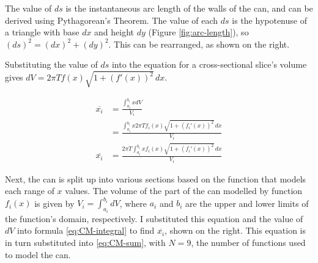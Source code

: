 \documentclass[11pt]{article}
\begin{document}
    The value of $ds$ is the instantaneous arc length of the walls of the can, and can be derived using Pythagorean's Theorem. The value of each $ds$ is the hypotenuse of a triangle with base $dx$ and height $dy$ (Figure \ref{fig:arc-length}), so $(ds)^2 = (dx)^2 + (dy)^2$. This can be rearranged, as shown on the right.

    Substituting the value of $ds$ into the equation for a cross-sectional slice's volume gives $dV = 2 \pi T f(x) \sqrt{1 + (f'(x))^2} \, dx$.

    \begin{figure}
        \footnotesize
        \begin{align*}
            \overline{x_i} &= \frac{\int_{a_i}^{b_i} x dV}{V_i} \\
            &= \frac{\int_{a_i}^{b_i} x 2 \pi T f_i(x) \sqrt{1 + (f_i'(x))^2} \, dx}{V_i} \\
            \overline{x_i} &= \frac{2 \pi T \int_{a_i}^{b_i} x f_i(x) \sqrt{1 + (f_i'(x))^2} \, dx}{V_i}
        \end{align*}
    \end{figure}

    Next, the can is split up into various sections based on the function that models each range of $x$ values. The volume of the part of the can modelled by function $f_i(x)$ is given by $V_i = \int_{a_i}^{b_i} dV$, where $a_i$ and $b_i$ are the upper and lower limits of the function's domain, respectively. I substituted this equation and the value of $dV$ into formula \eqref{eq:CM-integral} to find $\overline{x_i}$, shown on the right. This equation is in turn substituted into \eqref{eq:CM-sum}, with $N = 9$, the number of functions used to model the can.
\end{document}

